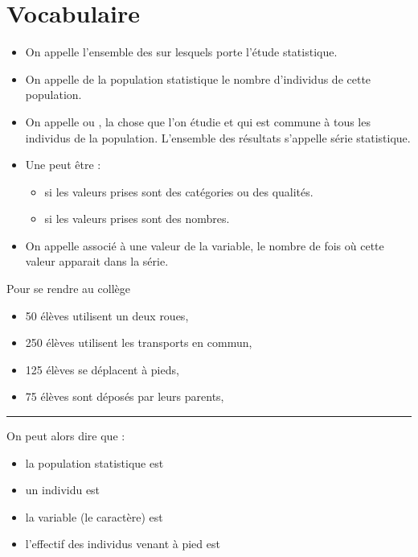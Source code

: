 \section{Vocabulaire}

\begin{definitionbox}
\begin{itemize}[label=\textbullet]
    \item On appelle  l'ensemble 
        des  sur lesquels porte l'étude statistique. 
    \item On appelle  de la population statistique le
        nombre d'individus de cette population. 
    \item On appelle  ou , la chose que l'on étudie
        et qui est commune à tous les individus de la population. L'ensemble des
        résultats s'appelle série statistique.
    \item Une  peut être :
        \begin{itemize}[label=\textbullet]
            \item {} si les valeurs prises sont des catégories
                ou des qualités.
            \item {} si les valeurs prises sont des nombres.
        \end{itemize}
    \item On appelle  associé à une valeur de la variable, le nombre de
        fois où cette valeur apparait dans la série.
\end{itemize}
\end{definitionbox}

\begin{exemplebox}
    Pour se rendre au collège

    \begin{itemize}[label=\textbullet]
        \item 50 élèves utilisent un deux roues,
        \item 250 élèves utilisent les transports en commun,
        \item 125 élèves se déplacent à pieds,
        \item 75 élèves sont déposés par leurs parents,
    \end{itemize}
    \begin{center}\rule{0.7\textwidth}{0.2pt}\end{center}
    On peut alors dire que :
    \begin{itemize}[label=\textbullet]
        \item la population statistique est 
        \item un individu est 
        \item la variable (le caractère) est 
        \item l'effectif des individus venant à pied est 
    \end{itemize}
\end{exemplebox}

